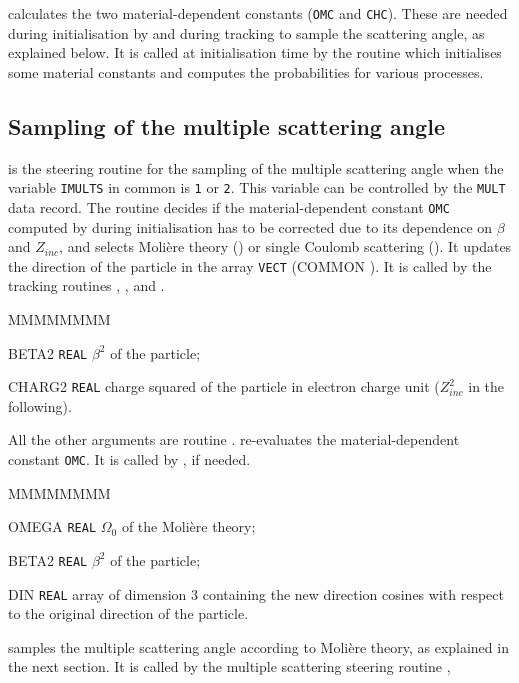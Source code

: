  calculates the two material-dependent constants 
({\tt OMC} and {\tt CHC}). These are 
needed during initialisation by  and during tracking
to sample the scattering angle, as explained below.
It is called at initialisation time by the routine
 which initialises some material constants and computes
the probabilities for various processes.

\subsection{Sampling of the multiple scattering angle}

 is the steering routine for the sampling
of the multiple scattering angle when the variable {\tt IMULTS}
in common  is {\tt 1} or {\tt 2}. This variable
can be controlled by the {\tt MULT} data record.
The routine decides if the material-dependent constant {\tt OMC}
computed by  during initialisation has to
be corrected due to its dependence on $\beta$ and $Z_{inc}$, and
selects Moli\`ere theory () 
or single Coulomb scattering ().
It updates the direction of the particle in the array 
{\tt VECT} (COMMON ).
It is called by the tracking routines , ,
 and .

\begin{DLtt}{MMMMMMMM}
\item[BETA2] {\tt REAL} $\beta^2$ of the particle;
\item[CHARG2] {\tt REAL} charge squared of the particle in electron
charge unit ($Z_{inc}^2$ in the following).
\end{DLtt}

All the other arguments are routine .
 re-evaluates the material-dependent constant {\tt OMC}.
It is called by , if needed. 

\begin{DLtt}{MMMMMMMM}
\item[OMEGA] {\tt REAL} $\Omega_0$ of the Moli\`{e}re theory;
\item[BETA2] {\tt REAL} $\beta^2$ of the particle;
\item[DIN]   {\tt REAL} array of dimension 3 containing the
new direction cosines with respect to the original direction of the
particle.
\end{DLtt}
 samples the multiple scattering angle according to
Moli\`{e}re theory, as explained in the next section.
It is called by the multiple scattering steering routine ,

